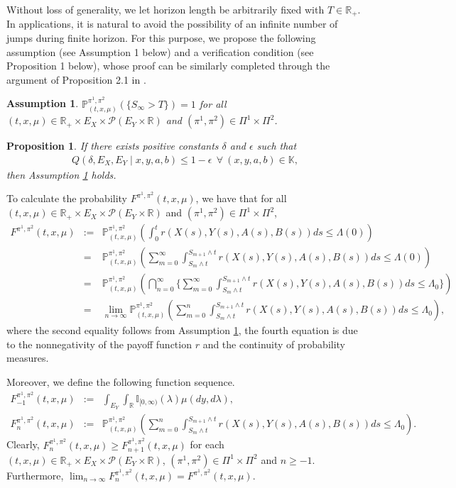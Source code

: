 \documentclass[12pt]{article}
\newtheorem{proposition}{Proposition}
\newtheorem{assumption}{Assumption}%
\begin{document}
Without loss of generality, we let horizon length be arbitrarily fixed with $T\in\mathbb{R}_+$.
In applications, it is natural to avoid the possibility of an infinite number of jumps during finite horizon.
For this purpose, we propose the following assumption (see Assumption 1 below) and a verification condition (see Proposition 1 below), whose proof can be similarly completed through the argument of Proposition 2.1 in \cite{huang2011finite}.
\begin{assumption}\label{ass1}
$\mathbb{P}^{\pi^1,\pi^2}_{(t,x,\mu)}(\{S_{\infty}>T\})=1$ for all $(t,x,\mu)\in \mathbb{R}_+\times E_X\times \mathscr{P}(E_Y\times \mathbb{R})$ and $(\pi^1,\pi^2)\in \Pi^1\times \Pi^2$.
\end{assumption}

\begin{proposition}
If there exists positive constants $\delta$ and $\epsilon$ such that
\begin{eqnarray*}
Q(\delta,E_X,E_Y\mid x,y,a,b)\leq 1-\epsilon ~~\forall~(x,y,a,b)\in \mathbb{K},
\end{eqnarray*}
then Assumption \ref{ass1} holds.
\end{proposition}

To calculate the probability $F^{\pi^1,\pi^2}(t,x,\mu)$, we have that for all $(t,x,\mu)\in \mathbb{R}_+\times E_X\times \mathscr{P}(E_Y\times \mathbb{R})$ and $(\pi^1,\pi^2)\in \Pi^1\times \Pi^2$,
\begin{eqnarray*} F^{\pi^1,\pi^2}(t,x,\mu)&:=&\mathbb{P}^{\pi^1,\pi^2}_{(t,x,\mu)}(\int_0^t r(X(s),Y(s),A(s),B(s))ds\leq \Lambda(0))\\
&=&\mathbb{P}^{\pi^1,\pi^2}_{(t,x,\mu)}(\sum_{m=0}^{\infty}\int_{S_m\wedge t}^{S_{m+1}\wedge t} r(X(s),Y(s),A(s),B(s))ds\leq \Lambda(0))\\
&=&\mathbb{P}^{\pi^1,\pi^2}_{(t,x,\mu)}(\bigcap_{n=0}^{\infty}\bigg\{\sum_{m=0}^{\infty}\int_{S_m\wedge t}^{S_{m+1}\wedge t} r(X(s),Y(s),A(s),B(s))ds\leq \Lambda_0\bigg\})\\
&=&\lim_{n\to\infty}\mathbb{P}^{\pi^1,\pi^2}_{(t,x,\mu)}(\sum_{m=0}^{n}\int_{S_m\wedge t}^{S_{m+1}\wedge t} r(X(s),Y(s),A(s),B(s))ds\leq \Lambda_0),
\end{eqnarray*}
where the second equality follows from Assumption \ref{ass1}, the fourth equation is due to the nonnegativity of the payoff function $r$ and the continuity of probability measures.

Moreover, we define the following function sequence.
\begin{eqnarray*}
F^{\pi^1,\pi^2}_{-1}(t,x,\mu)&:=&\int_{E_Y}\int_{\mathbb{R}}\mathbb{I}_{[0,\infty)}(\lambda)\mu(dy,d\lambda),\\
F^{\pi^1,\pi^2}_{n}(t,x,\mu)&:=&\mathbb{P}^{\pi^1,\pi^2}_{(t,x,\mu)}(\sum_{m=0}^{n}\int_{S_m\wedge t}^{S_{m+1}\wedge t} r(X(s),Y(s),A(s),B(s))ds\leq \Lambda_0).
\end{eqnarray*}
Clearly, $F^{\pi^1,\pi^2}_{n}(t,x,\mu)\ge F^{\pi^1,\pi^2}_{n+1}(t,x,\mu)$ for each $(t,x,\mu)\in \mathbb{R}_+\times E_X\times \mathscr{P}(E_Y\times \mathbb{R})$, $(\pi^1,\pi^2)\in \Pi^1\times \Pi^2$ and $n\ge -1$.
Furthermore, $\lim_{n\to\infty}F^{\pi^1,\pi^2}_{n}(t,x,\mu)=F^{\pi^1,\pi^2}(t,x,\mu)$.
\end{document}
